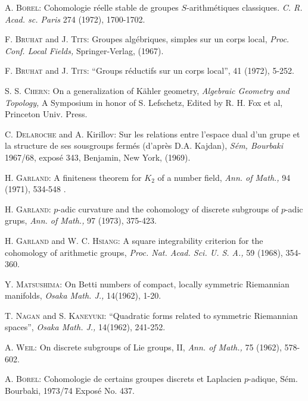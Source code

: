 \begin{thebibliography}{99}
 \textsc{A. Borel:} Cohomologie r\'eelle stable de groupes $S$-arithm\'etiques classiques. \textit{C. R. Acad. sc. Paris} 274 (1972), 1700-1702.

 \textsc{F. Bruhat} and \textsc{J. Tits}: Groupes alg\'ebriques, simples sur un corps local, \textit{Proc. Conf. Local Fields,} Springer-Verlag, (1967).

 \textsc{F. Bruhat} and \textsc{J. Tits:} ``Groups r\'eductifs sur un corps local'',  41 (1972), 5-252.

 \textsc{S. S. Chern}: On a generalization of K\"ahler geometry, \textit{Algebraic Geometry and Topology,} A Symposium in honor of S. Lefschetz, Edited by R. H. Fox et al, Princeton Univ. Press.

 \textsc{C. Delaroche} and A. Kirillov: Sur les relations entre l'espace dual d'un grupe et la structure de ses sousgroups ferm\'es (d'apr\`es D.A. Kajdan), \textit{S\'em, Bourbaki} 1967/68, expos\'e 343, Benjamin, New York, (1969).

 \textsc{H. Garland}: A finiteness theorem for $K_2$ of a number field, \textit{Ann. of Math.,} 94 (1971), 534-548 .

 \textsc{H. Garland}: $p$-adic curvature and the cohomology of discrete subgroups of $p$-adic grups, \textit{Ann. of Math.,} 97 (1973), 375-423.

 \textsc{H. Garland} and \textsc{W. C. Hsiang}: A square integrability criterion for the cohomology of arithmetic groups, \textit{Proc. Nat. Acad. Sci. U. S. A.,} 59 (1968), 354-360.

 \textsc{Y. Matsushima}: On Betti numbers of compact, locally symmetric Riemannian manifolds, \textit{Osaka Math. J.,} 14(1962), 1-20.

 \textsc{T. Nagan} and \textsc{S. Kaneyuki}: ``Quadratic forms related to symmetric Riemannian spaces'', \textit{Osaka Math. J.,} 14(1962), 241-252.

 \textsc{A. Weil:} On discrete subgroups of Lie groups, II, \textit{Ann. of Math.,} 75 (1962), 578-602.

 \textsc{A. Borel:} Cohomologie de certains groupes discrets et Laplacien $p$-adique, S\'em. Bourbaki, 1973/74 Expos\'e No. 437.
\end{thebibliography}





